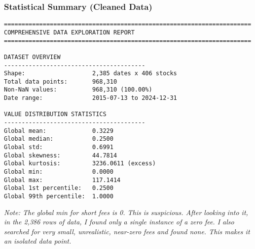 \documentclass[11pt, letterpaper]{article}
\begin{document}
\subsubsection*{Statistical Summary (Cleaned Data)}
\begin{verbatim}
======================================================================
COMPREHENSIVE DATA EXPLORATION REPORT
======================================================================

DATASET OVERVIEW
----------------------------------------
Shape:                   2,385 dates x 406 stocks
Total data points:       968,310
Non-NaN values:          968,310 (100.00%)
Date range:              2015-07-13 to 2024-12-31

VALUE DISTRIBUTION STATISTICS
----------------------------------------
Global mean:             0.3229
Global median:           0.2500
Global std:              0.6991
Global skewness:         44.7814
Global kurtosis:         3236.0611 (excess)
Global min:              0.0000
Global max:              117.1414
Global 1st percentile:   0.2500
Global 99th percentile:  1.0000
\end{verbatim}
\textit{Note: The global min for short fees is 0. This is suspicious. After looking into it, in the 2,386 rows of data, I found only a single instance of a zero fee. I also searched for very small, unrealistic, near-zero fees and found none. This makes it an isolated data point.}
\end{document}
